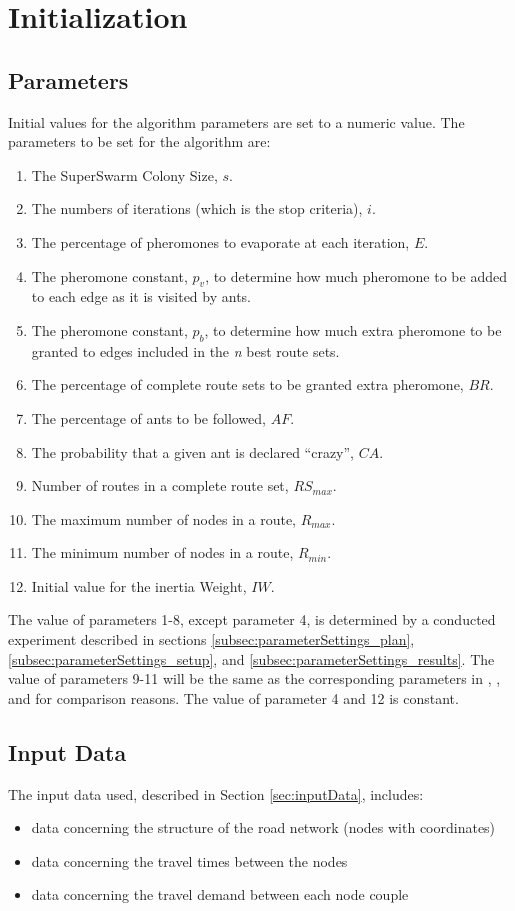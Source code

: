 \section{Initialization}
\label{sec:algoInitialization}
\subsection{Parameters}
Initial values for the algorithm parameters are set to a numeric value. The parameters to be set for the algorithm are:
\begin{enumerate}
\item The SuperSwarm Colony Size, $s$. 
\item The numbers of iterations (which is the stop criteria), $i$.
\item The percentage of pheromones to evaporate at each iteration, $E$.
\item The pheromone constant, $p_v$, to determine how much pheromone to be added to each edge as it is visited by ants.
\item The pheromone constant, $p_b$, to determine how much extra pheromone to be granted to edges included in the \textit{n} best route sets.
\item The percentage of complete route sets to be granted extra pheromone, $BR$.
\item The percentage of ants to be followed, $AF$.
\item The probability that a given ant is declared ``crazy'', $CA$.
\item Number of routes in a complete route set, $RS_{max}$. 
\item The maximum number of nodes in a route, $R_{max}$.
\item The minimum number of nodes in a route, $R_{min}$.
\item Initial value for the inertia Weight, $IW$.
\end{enumerate}
The value of parameters 1-8, except parameter 4, is determined by a conducted experiment described in sections \vref{subsec:parameterSettings_plan}, \vref{subsec:parameterSettings_setup}, and \vref{subsec:parameterSettings_results}. The value of parameters 9-11 will be the same as the corresponding parameters in \citet{mandl79}, \citet{kechagiopoulos14}, and \citet{nikolic14} for comparison reasons. The value of parameter 4 and 12 is constant.   

\subsection{Input Data}
The input data used, described in Section \vref{sec:inputData}, includes:
\begin{itemize}
\item data concerning the structure of the road network (nodes with coordinates)
\item data concerning the travel times between the nodes 
\item data concerning the travel demand between each node couple
\end{itemize}

